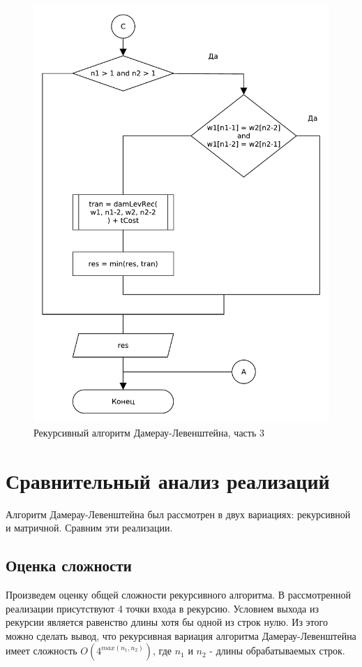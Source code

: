 \begin{figure}[H]
    \centering
    \includegraphics[scale=0.75]{pdf/damerau-levenshteainrec-part3.pdf}
    \caption{Рекурсивный алгоритм Дамерау-Левенштейна, часть 3}
\end{figure}

\section{Сравнительный анализ реализаций}
Алгоритм Дамерау-Левенштейна был рассмотрен в двух вариациях: рекурсивной и матричной. Сравним эти реализации.

\subsection{Оценка сложности}
Произведем оценку общей сложности рекурсивного алгоритма. В рассмотренной реализации присутствуют 4 точки входа в рекурсию. Условием выхода из рекурсии является равенство длины хотя бы одной из строк нулю. Из этого можно сделать вывод, что рекурсивная вариация алгоритма Дамерау-Левенштейна имеет сложность \(O(4^{max(n_1, n_2)})\), где \(n_1\) и \(n_2\) - длины обрабатываемых строк.

